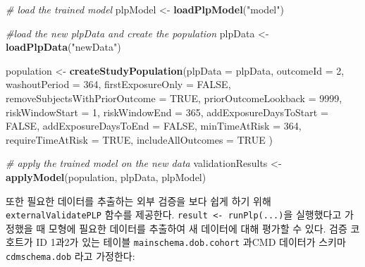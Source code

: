 \documentclass[11pt]{book}
\newenvironment{Shaded}{\begin{snugshade}}{\end{snugshade}}
\newcommand{\KeywordTok}[1]{\textcolor[rgb]{0.13,0.29,0.53}{\textbf{#1}}}
\newcommand{\DataTypeTok}[1]{\textcolor[rgb]{0.13,0.29,0.53}{#1}}
\newcommand{\DecValTok}[1]{\textcolor[rgb]{0.00,0.00,0.81}{#1}}
\newcommand{\StringTok}[1]{\textcolor[rgb]{0.31,0.60,0.02}{#1}}
\newcommand{\CommentTok}[1]{\textcolor[rgb]{0.56,0.35,0.01}{\textit{#1}}}
\newcommand{\OtherTok}[1]{\textcolor[rgb]{0.56,0.35,0.01}{#1}}
\newcommand{\NormalTok}[1]{#1}
\theoremstyle{definition}
\theoremstyle{definition}
\theoremstyle{definition}
\theoremstyle{remark}
\begin{document}
\begin{Shaded}
\begin{Highlighting}[]
\CommentTok{# load the trained model}
\NormalTok{plpModel <-}\StringTok{ }\KeywordTok{loadPlpModel}\NormalTok{(}\StringTok{"model"}\NormalTok{)}

\CommentTok{#load the new plpData and create the population}
\NormalTok{plpData <-}\StringTok{ }\KeywordTok{loadPlpData}\NormalTok{(}\StringTok{"newData"}\NormalTok{)}

\NormalTok{population <-}\StringTok{ }\KeywordTok{createStudyPopulation}\NormalTok{(}\DataTypeTok{plpData =}\NormalTok{ plpData,}
                                    \DataTypeTok{outcomeId =} \DecValTok{2}\NormalTok{,}
                                    \DataTypeTok{washoutPeriod =} \DecValTok{364}\NormalTok{,}
                                    \DataTypeTok{firstExposureOnly =} \OtherTok{FALSE}\NormalTok{,}
                                    \DataTypeTok{removeSubjectsWithPriorOutcome =} \OtherTok{TRUE}\NormalTok{,}
                                    \DataTypeTok{priorOutcomeLookback =} \DecValTok{9999}\NormalTok{,}
                                    \DataTypeTok{riskWindowStart =} \DecValTok{1}\NormalTok{,}
                                    \DataTypeTok{riskWindowEnd =} \DecValTok{365}\NormalTok{,}
                                    \DataTypeTok{addExposureDaysToStart =} \OtherTok{FALSE}\NormalTok{,}
                                    \DataTypeTok{addExposureDaysToEnd =} \OtherTok{FALSE}\NormalTok{,}
                                    \DataTypeTok{minTimeAtRisk =} \DecValTok{364}\NormalTok{,}
                                    \DataTypeTok{requireTimeAtRisk =} \OtherTok{TRUE}\NormalTok{,}
                                    \DataTypeTok{includeAllOutcomes =} \OtherTok{TRUE}
\NormalTok{)}

\CommentTok{# apply the trained model on the new data}
\NormalTok{validationResults <-}\StringTok{ }\KeywordTok{applyModel}\NormalTok{(population, plpData, plpModel)}
\end{Highlighting}
\end{Shaded}

또한 필요한 데이터를 추출하는 외부 검증을 보다 쉽게 하기 위해
\texttt{externalValidatePLP} 함수를 제공한다.
\texttt{result\ \textless{}-\ runPlp(...)}을 실행했다고 가정했을 때
모형에 필요한 데이터를 추출하여 새 데이터에 대해 평가할 수 있다. 검증
코호트가 ID 1과2가 있는 테이블 \texttt{mainschema.dob.cohort} 과CMD
데이터가 스키마 \texttt{cdmschema.dob} 라고 가정한다:
\end{document}
